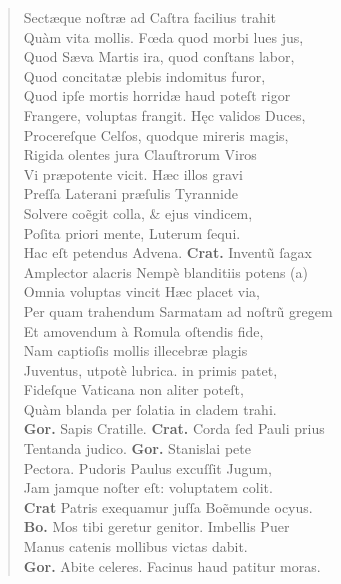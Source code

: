 \documentclass[a4paper,12pt]{article}
\begin{document}
\begin{verse}
Sectæque noſtræ ad Caſtra facilius trahit\\[0pt]
Quàm vita mollis. Fœda quod morbi lues jus,\\[0pt]
Quod Sæva Martis ira, quod conſtans labor,\\[0pt]
Quod concitatæ plebis indomitus furor,\\[0pt]
Quod ipſe mortis horridæ haud poteſt rigor\\[0pt]
Frangere, voluptas frangit. Hęc validos Duces,\\[0pt]
Procereſque Celſos, quodque mireris magis,\\[0pt]
Rigida olentes jura Clauſtrorum Viros\\[0pt]
Vi præpotente vicit. Hæc illos gravi\\[0pt]
Preſſa Laterani præſulis Tyrannide\\[0pt]
Solvere coẽgit colla, \& ejus vindicem,\\[0pt]
Poſita priori mente, Luterum ſequi.\\[0pt]
Hac eſt petendus Advena. \textbf{Crat.} Inventũ ſagax\\[0pt]
Amplector alacris Nempè blanditiis potens (a)\footnotemark\\[0pt]
Omnia voluptas vincit Hæc placet via,\\[0pt]
Per quam trahendum Sarmatam ad noſtrũ gregem\\[0pt]
Et amovendum à Romula oſtendis fide,\\[0pt]
Nam captioſis mollis illecebræ plagis\\[0pt]
Juventus, utpotè lubrica. in primis patet,\\[0pt]
Fideſque Vaticana non aliter poteſt,\\[0pt]
Quàm blanda per ſolatia in cladem trahi.\\[0pt]
\textbf{Gor.} Sapis Cratille. \textbf{Crat.} Corda ſed Pauli prius\\[0pt]
Tentanda judico. \textbf{Gor.} Stanislai pete\\[0pt]
Pectora. Pudoris Paulus excuſſit Jugum,\\[0pt]
Jam jamque noſter eſt: voluptatem colit.\\[0pt]
\textbf{Crat} Patris exequamur juſſa Boẽmunde ocyus.\\[0pt]
\textbf{Bo.} Mos tibi geretur genitor. Imbellis Puer\\[0pt]
Manus catenis mollibus victas dabit.\\[0pt]
\textbf{Gor.} Abite celeres. Facinus haud patitur moras.\\[0pt]

\end{verse}
\end{document}
